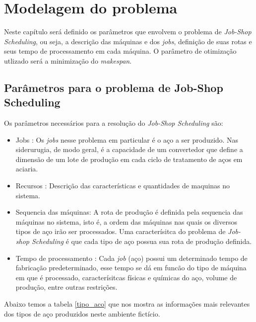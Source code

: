 \chapter{Modelagem do problema}
Neste capítulo será definido os parâmetros que envolvem o problema de {\it Job-Shop Scheduling}, ou seja, a descrição das máquinas e dos {\it jobs}, definição de suas rotas e seus tempo de processamento em cada máquina. O parâmetro de otimização  utlizado será a minimização do {\it makespan}.

\section{Parâmetros para o  problema de Job-Shop Scheduling}
Os parâmetros necessários para a resolução do {\it Job-Shop Scheduling} são:
\begin{itemize}
\item {Jobs} : Os {\it jobs} nesse problema em particular é o aço a ser produzido. Nas siderurugia, de modo geral, é a capacidade de um convertedor que define a dimensão de um lote de produção em cada ciclo de tratamento de aços em aciaria.

\item {Recursos} : Descrição das características e quantidades de maquinas no sistema.

\item{Sequencia das máquinas}: A rota de produção é definida pela sequencia das máquinas no sistema, isto é, a ordem das máquinas nas quais os diversos tipos de aço irão ser processados. Uma caracterísitca do 
problema de {\it Job-shop Scheduling} é que cada tipo de aço possua sua rota de produção definida.

\item{Tempo de processamento} : Cada {\it job} (aço) possui um determinado tempo de fabricação predeterminado, esse tempo se dá em funcão do tipo de máquina em que é processado, caracterísitcas físicas e químicas do aço, volume de produção, entre outras restrições.

\end{itemize}

Abaixo temos a tabela \ref{tipo_aco} que nos mostra as informações mais relevantes dos tipos de aço produzidos neste ambiente fictício.

